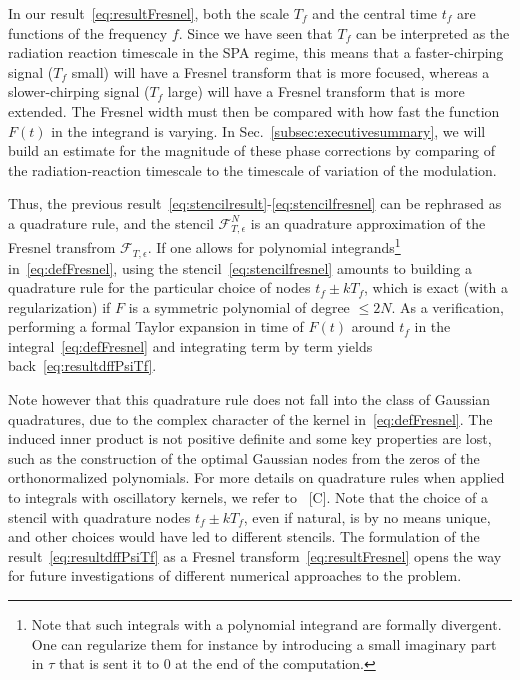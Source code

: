 \documentclass[aps,showpacs,twocolumn,
prd,superscriptaddress,nofootinbib]{revtex4-1}
\newcommand\calF{{\mathcal{F}}}
\newcommand{\tf}{t_{f}}
\newcommand{\Tf}{T_{f}}
\newcommand{\SM}[1]{{\color{Red} #1}}
\newcommand{\jgb}[1]{{\color{DarkGreen} #1}}
\begin{document}
In our result~\eqref{eq:resultFresnel}, both the scale $\Tf$ and the central time $\tf$ are functions of the frequency $f$. Since we have seen that $\Tf$ can be interpreted as the radiation reaction timescale in the SPA regime, this means that a faster-chirping signal ($\Tf$ small) will have a Fresnel transform that is more focused, whereas a slower-chirping signal ($\Tf$ large) will have a Fresnel transform that is more extended. \jgb{The Fresnel width must then be compared} with how fast the function $F(t)$ in the integrand is varying. In Sec.~\ref{subsec:executivesummary}, we will build an estimate for the magnitude of these phase corrections by comparing of the radiation-reaction timescale to the timescale of variation of the modulation.

Thus, the previous result~\eqref{eq:stencilresult}-\eqref{eq:stencilfresnel} can be rephrased as a quadrature rule, and the stencil $\calF_{T, \epsilon}^{N}$ is an quadrature approximation of the Fresnel transfrom $\calF_{T, \epsilon}$. If one allows for polynomial integrands\footnote{Note that such integrals with a polynomial integrand are formally divergent. One can regularize them for instance by introducing a small imaginary part in $\tau$ that is sent it to $0$ at the end of the computation.} in~\eqref{eq:defFresnel}, using the stencil~\eqref{eq:stencilfresnel} amounts to building a quadrature rule for the particular choice of nodes $\tf \pm k \Tf$, which is exact (with a regularization) if $F$ is a symmetric polynomial of degree $\leq 2N$. As a verification, performing a formal Taylor expansion in time of $F(t)$ around $\tf$ in the integral~\eqref{eq:defFresnel} and integrating term by term yields back~\eqref{eq:resultdffPsiTf}.

Note however that this quadrature rule does not fall into the class of Gaussian quadratures, due to the complex character of the kernel in~\eqref{eq:defFresnel}. The induced inner product is not positive definite and some key properties are lost, such as the construction of the optimal Gaussian nodes from the zeros of the orthonormalized polynomials. For more details on quadrature rules when applied to integrals with oscillatory kernels, we refer to~\cite{} \SM{[C]}. Note that the choice of a stencil with quadrature nodes $\tf \pm k\Tf$, even if natural, is by no means unique, and other choices would have led to different stencils. The formulation of the result~\eqref{eq:resultdffPsiTf} as a Fresnel transform~\eqref{eq:resultFresnel} opens the way for future investigations of different numerical approaches to the problem.
\end{document}
